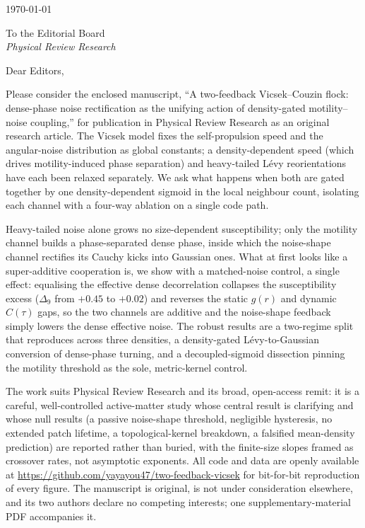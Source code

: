 \documentclass[11pt,a4paper]{article}
\begin{document}
\hfill\today

\medskip

To the Editorial Board\\
\emph{Physical Review Research}

\medskip

Dear Editors,

Please consider the enclosed manuscript, ``A two-feedback
Vicsek--Couzin flock: dense-phase noise rectification as the
unifying action of density-gated motility--noise coupling,'' for
publication in Physical Review Research as an original research
article. The Vicsek model fixes the self-propulsion speed and the
angular-noise distribution as global constants; a density-dependent
speed (which drives motility-induced phase separation) and
heavy-tailed L\'evy reorientations have each been relaxed
separately. We ask what happens when both are gated together by one
density-dependent sigmoid in the local neighbour count, isolating
each channel with a four-way ablation on a single code path.

Heavy-tailed noise alone grows no size-dependent susceptibility;
only the motility channel builds a phase-separated dense phase,
inside which the noise-shape channel rectifies its Cauchy kicks
into Gaussian ones. What at first looks like a super-additive
cooperation is, we show with a matched-noise control, a single
effect: equalising the effective dense decorrelation collapses the
susceptibility excess ($\Delta_9$ from $+0.45$ to $+0.02$) and
reverses the static $g(r)$ and dynamic $C(\tau)$ gaps, so the two
channels are additive and the noise-shape feedback simply lowers
the dense effective noise. The robust results are a two-regime
split that reproduces across three densities, a density-gated
L\'evy-to-Gaussian conversion of dense-phase turning, and a
decoupled-sigmoid dissection pinning the motility threshold as the
sole, metric-kernel control.

The work suits Physical Review Research and its broad, open-access
remit: it is a careful, well-controlled active-matter study whose
central result is clarifying and whose null results (a passive
noise-shape threshold, negligible hysteresis, no extended patch
lifetime, a topological-kernel breakdown, a falsified mean-density
prediction) are reported rather than buried, with the finite-size
slopes framed as crossover rates, not asymptotic exponents. All
code and data are openly available at
\url{https://github.com/yayayou47/two-feedback-vicsek} for
bit-for-bit reproduction of every figure. The manuscript is
original, is not under consideration elsewhere, and its two authors
declare no competing interests; one supplementary-material PDF
accompanies it.
\end{document}
